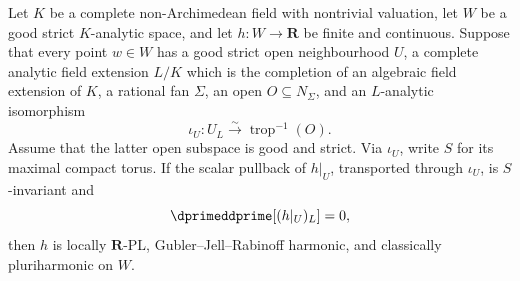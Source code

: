 
\begin{corollary}
\label{cor:p062-local-algebraic-split-invariant-scalar-stable-zero-current}
Let \(K\) be a complete non-Archimedean field with nontrivial valuation,
let \(W\) be a good strict \(K\)-analytic space, and let
\(h:W\to\mathbf R\) be finite and continuous.  Suppose that every point
\(w\in W\) has a good strict open neighbourhood \(U\), a complete analytic
field extension \(L/K\) which is the completion of an algebraic field
extension of \(K\), a rational fan \(\Sigma\), an open
\(O\subseteq N_\Sigma\), and an \(L\)-analytic isomorphism
\[
            \iota_U:U_L\xrightarrow{\sim}\operatorname{trop}^{-1}(O).
\]
Assume that the latter open subspace is good and strict.  Via \(\iota_U\),
write \(S\) for its maximal compact torus.  If the scalar pullback of
\(h|_U\), transported through \(\iota_U\), is \(S\)-invariant and
\[
                     \dprimeddprime[(h|_U)_L]=0,
\]
then \(h\) is locally \(\mathbf R\)-PL, Gubler--Jell--Rabinoff harmonic,
and classically pluriharmonic on \(W\).
\end{corollary}
